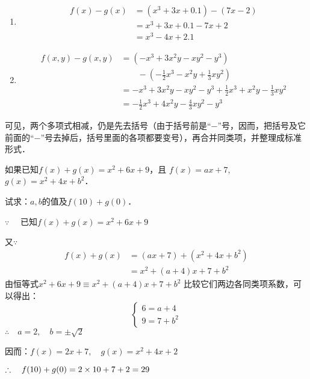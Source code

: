 \begin{solution}
    \begin{enumerate}
        \item \[\begin{split}
            f(x)-g(x)&=  (x^3+3x+0.1)-(7x-2)\\
            &=x^3+3x+0.1-7x+2\\
            &=x^3-4x+2.1
        \end{split}\]
        \item \[\begin{split}
            f(x,y)-g(x,y)&=(-x^3+3x^2y-xy^2-y^3) \\
            &\qquad -\left(-\frac{1}{2}x^3-x^2y+\frac{1}{3}xy^2\right)\\
            &=-x^3+3x^2y-xy^2-y^3+\frac{1}{2}x^3+x^2y-\frac{1}{3}xy^2\\
            &=-\frac{1}{2}x^3+4x^2y-\frac{4}{3}xy^2-y^3
        \end{split}\]
    \end{enumerate}
\end{solution}

可见，两个多项式相减，仍是先去括号（由于括号前是“$-$”号，因而，把括号及它前面的“$-$”号去掉后，括号里面的各项都要变号），再合并同类项，并整理成标准形式．

\begin{example}
    如果已知$f(x)+g(x)=x^2+6x+9$，且
$f (x) =ax+7$, $g (x) =x^2+4x+b^2$．

试求：$a,b$的值及$f(10)+g(0)$．
\end{example}

\begin{solution}
$\because\quad $ 已知$f(x)+g(x)=x^2+6x+9$

又$\because\quad $
\[\begin{split}
    f(x)+g(x)&=(ax+7)+(x^2+4x+b^2)\\
    &=x^2+ (a+4) x+7+b^2
\end{split}\]
    由恒等式$x^2+6x+9\equiv x^2+(a+4)x+7+b^2$
    比较它们两边各同类项系数，可以得出：
\[\begin{cases}
    6=a+4\\
    9=7+b^2
\end{cases}\]
$\therefore\quad a=2,\quad b=\pm\sqrt{2}$

因而：$f(x)=2x+7,\quad g(x)=x^2+4x+2$

$\therefore\quad f(10)+g(0)=2\times 10+7+2=29$
\end{solution}

